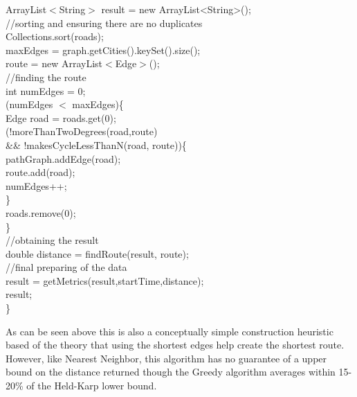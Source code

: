\documentclass[midd]{thesis}
\newcommand{\tab}{\hspace*{2em}}
\begin{document}
\begin{codebox}
\tab ArrayList$<$String$>$ result = new ArrayList<String>();\\
\tab//sorting and ensuring there are no duplicates\\
\tab Collections.sort(roads);\\
\tab maxEdges = graph.getCities().keySet().size();\\
\tab route = new ArrayList$<$Edge$>$();\\
\tab//finding the route\\
\tab int numEdges = 0;\\
\tab\While(numEdges $<$ maxEdges)\{\\
\tab\tab Edge road = roads.get(0);\\
\tab\tab \If(!moreThanTwoDegrees(road,route)\\
\tab\tab\tab \&\& !makesCycleLessThanN(road, route))\{\\
\tab\tab\tab pathGraph.addEdge(road);\\
\tab\tab\tab route.add(road);\\
\tab\tab\tab numEdges++;\\
\tab\tab\}\\\End
\tab\tab roads.remove(0);\\
\tab\}\\\End
\tab //obtaining the result\\
\tab double distance = findRoute(result, route);\\
\tab //final preparing of the data\\
\tab result = getMetrics(result,startTime,distance);\\
\tab \Return result;\\
\}
\end{codebox}
\tab As can be seen above this is also a conceptually simple construction heuristic based of the theory that using the shortest edges help create the shortest route. However, like Nearest Neighbor, this algorithm has no guarantee of a upper bound on the distance returned though the Greedy algorithm averages within 15-20\% of the Held-Karp lower bound\cite{htspc}.\\
\end{document}

